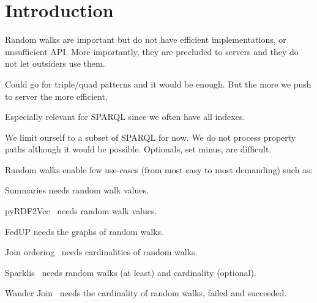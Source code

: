 
\section{Introduction}

Random walks are important but do not have efficient implementations,
or unsufficient API. More importantly, they are precluded to servers
and they do not let outsiders use them.

Could go for triple/quad patterns and it would be enough. But the more
we push to server the more efficient.

Especially relevant for SPARQL since we often have all indexes.

We limit ourself to a subset of SPARQL for now. We do not process
property paths although it would be possible. Optionals, set minus, are
difficult.


Random walks enable few use-cases (from most easy to most demanding)
such as:
\begin{asparadesc}
\item [Summaries] needs random walk values.
\item [pyRDF2Vec~\cite{steenwinckel2023pyrdf2vec}] needs random walk values.
\item [FedUP] needs the graphs of random walks.
\item [Join ordering~\REF] needs cardinalities of random walks.
\item [Sparklis~\cite{ferre2017sparklis}] needs random walks (at
  least) and cardinality (optional).
\item [Wander Join~\cite{li2016wanderjoin}] needs the cardinality of
  random walks, failed and succeeded.
\end{asparadesc}
